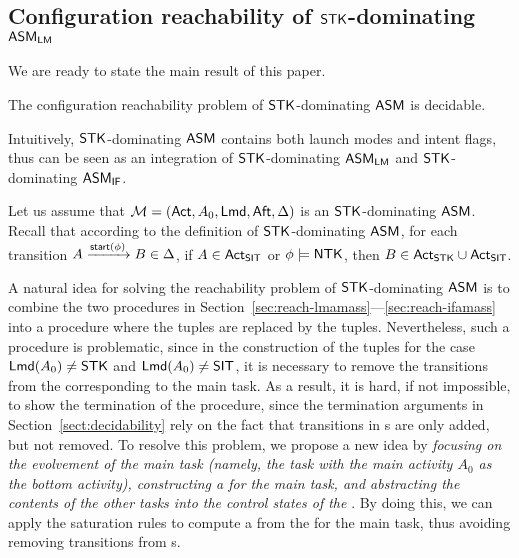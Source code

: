 


\subsection{Configuration reachability of $\mathsf{STK}$-dominating $\textsf{ASM}_\textsf{LM}$}
We are ready to state the main result of this paper. 

\begin{theorem}\label{thm:st-amass-reach}
	The configuration reachability problem of $\mathsf{STK}$-dominating $\textsf{ASM}$ is decidable.
\end{theorem}

Intuitively, $\mathsf{STK}$-dominating $\textsf{ASM}$ contains both launch modes and intent flags, thus can be seen as an integration of $\mathsf{STK}$-dominating $\textsf{ASM}_\textsf{LM}$ and $\mathsf{STK}$-dominating $\textsf{ASM}_\textsf{IF}$. 

Let us assume that ${\mathcal{M} } = ({\sf Act},A_0,{\sf Lmd},{\sf Aft},\Delta)$ is an $\mathsf{STK}$-dominating $\textsf{ASM}$. Recall that according to the definition of ${\sf STK}$-dominating $\textsf{ASM}$, for each transition $A \xrightarrow{{\mathsf{start} }(\phi)} B \in \Delta$, if $A \in {\sf Act}_{\sf SIT}$ or $\phi \models {\sf NTK}$, then $B \in {\sf Act}_{\sf STK} \cup {\sf Act}_{\sf SIT}$.

A natural idea for solving the reachability problem of $\mathsf{STK}$-dominating $\textsf{ASM}$ is to combine the two procedures in Section~\ref{sec:reach-lmamass}---\ref{sec:reach-ifamass} into a procedure where the {\NFA} tuples are replaced by the {\WOTrNFA} tuples.  
Nevertheless, such a procedure is problematic, since in the construction of the {\WOTrNFA} tuples for the case ${\sf Lmd}(A_0) \neq \mathsf{STK}$ and ${\sf Lmd}(A_0) \neq \mathsf{SIT}$, it is necessary to remove the transitions from the {\WOTrNFA} corresponding to the main task. As a result, it is hard, if not impossible, to show the termination of the procedure, since the termination arguments in Section~\ref{sect:decidability} rely on the fact that transitions in {\WOTrNFA}s are only added, but not removed. 
To resolve this problem, we propose a new idea by \emph{focusing on the evolvement of the main task (namely, the task with the main activity $A_0$ as the bottom activity), constructing a {\WOTrPDS} for the main task, and abstracting the contents of the other tasks into the control states of the {\WOTrPDS}}. By doing this, we can apply the saturation rules to compute a {\WOTrNFA} from the {\WOTrPDS} for the main task, thus avoiding removing transitions from {\WOTrNFA}s.

